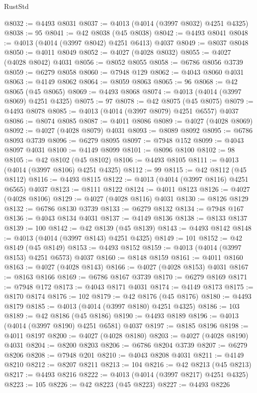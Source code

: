 \begin{lexlean}{RustStd}
\begin{coremodule}
@8032 := @4493 @8031
@8037 := @4013 (@4014 (@3997 @8032) @4251 @4325)
@8038 := 95
@8041 := @42 @8038 (@45 @8038)
@8042 := @4493 @8041
@8048 := @4013 (@4014 (@3997 @8042) @4251 @6413) @4037
@8049 := @8037 @8048
@8050 := @4011 @8049
@8052 := @4027 (@4028 @8032)
@8055 := @4027 (@4028 @8042) @4031
@8056 := @8052 @8055
@8058 := @6786 @8056 @3739
@8059 := @6279 @8058
@8060 := @7948 @129
@8062 := @4043 @8060 @4031
@8063 := @4149 @8062
@8064 := @8059 @8063
@8065 := 96
@8068 := @42 @8065 (@45 @8065)
@8069 := @4493 @8068
@8074 := @4013 (@4014 (@3997 @8069) @4251 @4325)
@8075 := 97
@8078 := @42 @8075 (@45 @8075)
@8079 := @4493 @8078
@8085 := @4013 (@4014 (@3997 @8079) @4251 @6557) @4037
@8086 := @8074 @8085
@8087 := @4011 @8086
@8089 := @4027 (@4028 @8069)
@8092 := @4027 (@4028 @8079) @4031
@8093 := @8089 @8092
@8095 := @6786 @8093 @3739
@8096 := @6279 @8095
@8097 := @7948 @152
@8099 := @4043 @8097 @4031
@8100 := @4149 @8099
@8101 := @8096 @8100
@8102 := 98
@8105 := @42 @8102 (@45 @8102)
@8106 := @4493 @8105
@8111 := @4013 (@4014 (@3997 @8106) @4251 @4325)
@8112 := 99
@8115 := @42 @8112 (@45 @8112)
@8116 := @4493 @8115
@8122 := @4013 (@4014 (@3997 @8116) @4251 @6565) @4037
@8123 := @8111 @8122
@8124 := @4011 @8123
@8126 := @4027 (@4028 @8106)
@8129 := @4027 (@4028 @8116) @4031
@8130 := @8126 @8129
@8132 := @6786 @8130 @3739
@8133 := @6279 @8132
@8134 := @7948 @167
@8136 := @4043 @8134 @4031
@8137 := @4149 @8136
@8138 := @8133 @8137
@8139 := 100
@8142 := @42 @8139 (@45 @8139)
@8143 := @4493 @8142
@8148 := @4013 (@4014 (@3997 @8143) @4251 @4325)
@8149 := 101
@8152 := @42 @8149 (@45 @8149)
@8153 := @4493 @8152
@8159 := @4013 (@4014 (@3997 @8153) @4251 @6573) @4037
@8160 := @8148 @8159
@8161 := @4011 @8160
@8163 := @4027 (@4028 @8143)
@8166 := @4027 (@4028 @8153) @4031
@8167 := @8163 @8166
@8169 := @6786 @8167 @3739
@8170 := @6279 @8169
@8171 := @7948 @172
@8173 := @4043 @8171 @4031
@8174 := @4149 @8173
@8175 := @8170 @8174
@8176 := 102
@8179 := @42 @8176 (@45 @8176)
@8180 := @4493 @8179
@8185 := @4013 (@4014 (@3997 @8180) @4251 @4325)
@8186 := 103
@8189 := @42 @8186 (@45 @8186)
@8190 := @4493 @8189
@8196 := @4013 (@4014 (@3997 @8190) @4251 @6581) @4037
@8197 := @8185 @8196
@8198 := @4011 @8197
@8200 := @4027 (@4028 @8180)
@8203 := @4027 (@4028 @8190) @4031
@8204 := @8200 @8203
@8206 := @6786 @8204 @3739
@8207 := @6279 @8206
@8208 := @7948 @201
@8210 := @4043 @8208 @4031
@8211 := @4149 @8210
@8212 := @8207 @8211
@8213 := 104
@8216 := @42 @8213 (@45 @8213)
@8217 := @4493 @8216
@8222 := @4013 (@4014 (@3997 @8217) @4251 @4325)
@8223 := 105
@8226 := @42 @8223 (@45 @8223)
@8227 := @4493 @8226

\end{coremodule}
\end{lexlean}
